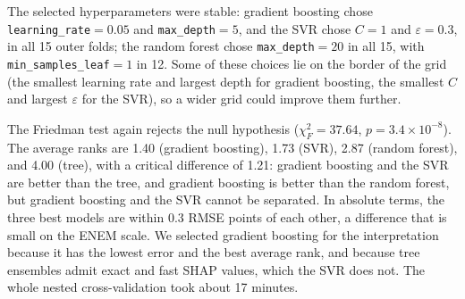 The selected hyperparameters were stable: gradient boosting chose \texttt{learning\_rate}$=0.05$
and \texttt{max\_depth}$=5$, and the SVR chose $C=1$ and $\varepsilon=0.3$, in all 15 outer folds;
the random forest chose \texttt{max\_depth}$=20$ in all 15, with \texttt{min\_samples\_leaf}$=1$ in
12. Some of these choices lie on the border of the grid (the smallest learning rate and largest
depth for gradient boosting, the smallest $C$ and largest $\varepsilon$ for the SVR), so a wider
grid could improve them further.

The Friedman test again rejects the null hypothesis ($\chi^2_F = 37.64$, $p = 3.4 \times
10^{-8}$). The average ranks are 1.40 (gradient boosting), 1.73 (SVR), 2.87 (random forest), and
4.00 (tree), with a critical difference of 1.21: gradient boosting and the SVR are better than the
tree, and gradient boosting is better than the random forest, but gradient boosting and the SVR
cannot be separated. In absolute terms, the three best models are within 0.3 RMSE points of each
other, a difference that is small on the ENEM scale. We selected gradient boosting for the
interpretation because it has the lowest error and the best average rank, and because tree
ensembles admit exact and fast SHAP values, which the SVR does not. The whole nested
cross-validation took about 17 minutes.